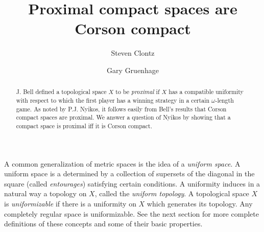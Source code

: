 \documentclass{amsart}
\theoremstyle{definition}
\theoremstyle{remark}
\newcommand{\<}{\langle}
\renewcommand{\>}{\rangle}
\newcommand{\term}{\textit}
\begin{document}
\title{Proximal compact spaces are Corson compact}




\author{Steven Clontz}
\address{Department of Mathematics, Auburn University,
Auburn, AL 36830}

\author{Gary Gruenhage}
\address{Department of Mathematics, Auburn University,
Auburn, AL 36830}




\begin{abstract}

J. Bell defined a topological space $X$ to be \term{proximal} if $X$ has a compatible uniformity with respect to which the first player has a winning strategy in a certain $\omega$-length game.  As noted by P.J. Nyikos, it follows easily from Bell's results that Corson compact spaces are proximal.  We answer a question of Nyikos by showing that a compact space is proximal iff it is Corson compact.
\end{abstract}


\maketitle

A common generalization of metric spaces is the idea of a \term{uniform space}.  A uniform space is a determined by a collection of supersets of the diagonal in the square (called \term{entourages})  satisfying certain conditions.  A uniformity induces in a natural way a topology on $X$, called the \term{uniform topology}.  A topological space $X$ is \term{uniformizable} if there is  a uniformity on $X$ which generates its topology.   Any completely regular space is uniformizable.  See the next section for more complete definitions of these concepts and some of their basic properties.
\end{document}
